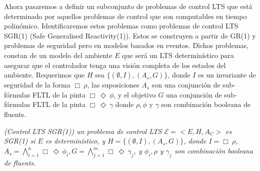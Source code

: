 Ahora pasaremos a definir un subconjunto de problemas de control LTS que está determinado por aquellos problemas de
control que son computables en tiempo polinómico. Identificaremos estos problemas como problemas de control LTS SGR(1)
(Safe Generalised Reactivity(1)). Estos se construyen a partir de GR(1) y problemas de seguridad pero en modelos basados
en eventos. Dichos problemas, constan de un modelo del ambiente $E$ que será un LTS determinístico para asegurar que el
controlador tenga una visión completa de los estados del ambiente. Requerimos que $H$ sea $\{(\emptyset,I),(A_s,G)\}$,
donde $I$ es un invariante de seguridad de la forma $\Box\ \rho$, las suposiciones $A_s$ son una conjunción de sub-fórmulas
FLTL de la pinta $\Box\ \Diamond\ \phi$, y el objetivo $G$ una conjunción de sub-fórmulas FLTL de la pinta $\Box\ \Diamond\ \gamma$
donde $\rho,\phi$ y $\gamma$ son combinación booleana de fluents.

\begin{nahaDef}\label{ControlLTSSGR1}
    \emph{(Control LTS SGR(1)) un problema de control LTS $\mathcal{E} = <E,H,A_C>$ es SGR(1) si $E$ es
    determinístico, y $H = \{(\emptyset,I),(A_s,G)\}$, donde $I = \Box\ \rho$, $A_s = \bigwedge_{i=1}^{n}
    \Box\ \Diamond\ \phi_i, G = \bigwedge_{j=1}^{m}\Box\ \Diamond\ \gamma_j$, y $\phi_i, \rho$ y $\gamma_j$ son combinación
    booleana de fluents.}
\end{nahaDef}

